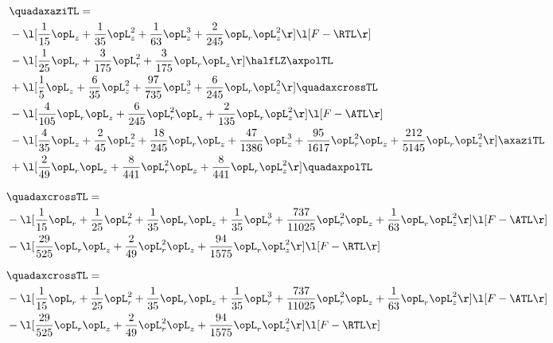 \begin{alignat}{2} 
\label{eq:quadaxaziTL_1} 
& \quadaxaziTL = \\ 
& - \l[ \frac{1}{15} \opL_z + \frac{1}{35} \opL_z^{2} + \frac{1}{63} \opL_z^{3} + \frac{2}{245} \opL_r \opL_z^{2}  \r] \l[ F - \RTL \r] \nonumber \\ 
& - \l[ \frac{1}{25} \opL_r + \frac{3}{175} \opL_r^{2} + \frac{3}{175} \opL_r \opL_z  \r] \halfLZ \axpolTL \nonumber \\ 
& + \l[ \frac{1}{5} \opL_z + \frac{6}{35} \opL_z^{2} + \frac{97}{735} \opL_z^{3} + \frac{6}{245} \opL_r \opL_z^{2}  \r] \quadaxcrossTL \nonumber \\ 
& - \l[ \frac{4}{105} \opL_r \opL_z + \frac{6}{245} \opL_r^{2} \opL_z + \frac{2}{135} \opL_r \opL_z^{2}  \r] \l[ F - \ATL \r] \nonumber \\ 
& - \l[ \frac{4}{35} \opL_z + \frac{2}{45} \opL_z^{2} + \frac{18}{245} \opL_r \opL_z + \frac{47}{1386} \opL_z^{3} + \frac{95}{1617} \opL_r^{2} \opL_z + \frac{212}{5145} \opL_r \opL_z^{2}  \r] \axaziTL \nonumber \\ 
& + \l[ \frac{2}{49} \opL_r \opL_z + \frac{8}{441} \opL_r^{2} \opL_z + \frac{8}{441} \opL_r \opL_z^{2}  \r] \quadaxpolTL \nonumber \\ 
\end{alignat} 


\begin{alignat}{2} 
\label{eq:quadaxcrossTL_2} 
& \quadaxcrossTL = \\ 
& - \l[ \frac{1}{15} \opL_r + \frac{1}{25} \opL_r^{2} + \frac{1}{35} \opL_r \opL_z + \frac{1}{35} \opL_r^{3} + \frac{737}{11025} \opL_r^{2} \opL_z + \frac{1}{63} \opL_r \opL_z^{2}  \r] \l[ F - \ATL \r] \nonumber \\ 
& - \l[ \frac{29}{525} \opL_r \opL_z + \frac{2}{49} \opL_r^{2} \opL_z + \frac{94}{1575} \opL_r \opL_z^{2}  \r] \l[ F - \RTL \r] \nonumber \\ 
\end{alignat} 


\begin{alignat}{2} 
\label{eq:quadaxcrossTL_3} 
& \quadaxcrossTL = \\ 
& - \l[ \frac{1}{15} \opL_r + \frac{1}{25} \opL_r^{2} + \frac{1}{35} \opL_r \opL_z + \frac{1}{35} \opL_r^{3} + \frac{737}{11025} \opL_r^{2} \opL_z + \frac{1}{63} \opL_r \opL_z^{2}  \r] \l[ F - \ATL \r] \nonumber \\ 
& - \l[ \frac{29}{525} \opL_r \opL_z + \frac{2}{49} \opL_r^{2} \opL_z + \frac{94}{1575} \opL_r \opL_z^{2}  \r] \l[ F - \RTL \r] \nonumber \\ 
\end{alignat} 



